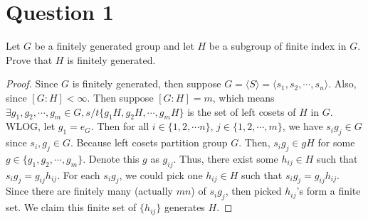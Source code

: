 \section{Question 1}

\begin{question}
    Let $G$ be a finitely generated group and let $H$ be a subgroup of finite index in $G$. Prove that $H$ is finitely generated.
\end{question}

\begin{answer}
    \begin{proof}
        Since $G$ is finitely generated, then suppose $G = \langle S \rangle = \langle s_1,s_2,\cdots,s_n \rangle$. Also, since $[G:H] < \infty$. Then suppose $[G:H] = m$, which means $\exists g_1,g_2,\cdots,g_m \in G, s/t \{g_1H,g_2H,\cdots,g_mH\}$ is the set of left cosets of $H$ in $G$. WLOG, let $g_1 = e_G$. Then for all $i \in \{1,2,\cdots n\}$, $j \in \{1,2,\cdots,m\}$, we have $s_ig_j \in G$ since $s_i,g_j \in G$. Because left cosets partition group $G$. Then, $s_i g_j \in gH$ for some $g \in \{g_1,g_2,\cdots,g_m\}$. Denote this $g$ as $g_{ij}$. Thus, there exist some $h_{ij} \in H$ such that $s_i g_j = g_{ij}h_{ij}$. For each $s_ig_j$, we could pick one $h_{ij} \in H$ such that $s_ig_j = g_{ij}h_{ij}$. Since there are finitely many (actually $mn$) of $s_ig_j$, then picked $h_{ij}$'s form a finite set. We claim this finite set of $\{h_{ij}\}$ generates $H$.
        

\end{proof}
\end{answer}
